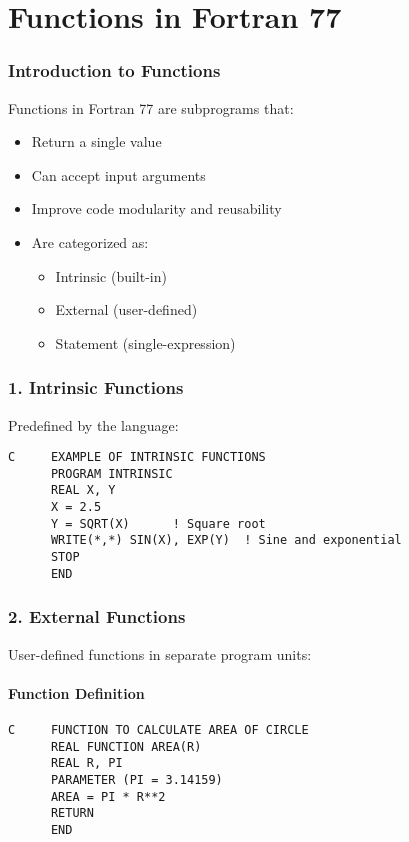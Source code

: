 \documentclass{book}
\begin{document}
\chapter{Functions in Fortran 77}

\subsection*{Introduction to Functions}
Functions in Fortran 77 are subprograms that:
\begin{itemize}
\item Return a single value
\item Can accept input arguments
\item Improve code modularity and reusability
\item Are categorized as:
  \begin{itemize}
  \item Intrinsic (built-in)
  \item External (user-defined)
  \item Statement (single-expression)
  \end{itemize}
\end{itemize}

\subsection*{1. Intrinsic Functions}
Predefined by the language:
\begin{verbatim}
C     EXAMPLE OF INTRINSIC FUNCTIONS
      PROGRAM INTRINSIC
      REAL X, Y
      X = 2.5
      Y = SQRT(X)      ! Square root
      WRITE(*,*) SIN(X), EXP(Y)  ! Sine and exponential
      STOP
      END
\end{verbatim}

\subsection*{2. External Functions}
User-defined functions in separate program units:

\subsubsection*{Function Definition}
\begin{verbatim}
C     FUNCTION TO CALCULATE AREA OF CIRCLE
      REAL FUNCTION AREA(R)
      REAL R, PI
      PARAMETER (PI = 3.14159)
      AREA = PI * R**2
      RETURN
      END
\end{verbatim}
\end{document}
